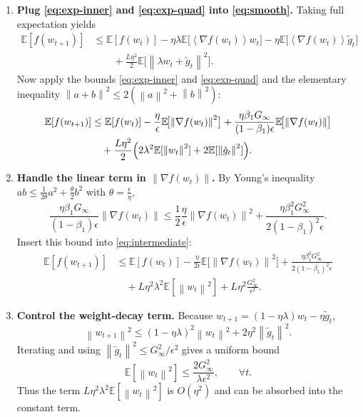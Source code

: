 \documentclass{article}
\newcommand{\E}{\mathbb{E}}
\newcommand{\norm}[1]{\left\|#1\right\|}
\newcommand{\inner}[1]{\left\langle#1\right\rangle}
\begin{document}
\begin{enumerate}
\item[Step 5.] \textbf{Plug \eqref{eq:exp-inner} and \eqref{eq:exp-quad} into \eqref{eq:smooth}.}  
Taking full expectation yields
\begin{align}
\E[f(w_{t+1})]
&\le \E[f(w_{t})]
   -\eta\lambda\E\bigl[\inner{\nabla f(w_{t})}{w_{t}}\bigr]
   -\eta\E\bigl[\inner{\nabla f(w_{t})}{\tilde g_{t}}\bigr]\nonumber\\
&\qquad +\frac{L\eta^{2}}{2}\E\!\bigl[\norm{\lambda w_{t}+\tilde g_{t}}^{2}\bigr].
\label{eq:after-exp}
\end{align}
Now apply the bounds \eqref{eq:exp-inner} and \eqref{eq:exp-quad} and the elementary inequality
$\norm{a+b}^{2}\le2(\norm{a}^{2}+\norm{b}^{2})$:
\begin{align}
\E[f(w_{t+1})]
&\le \E[f(w_{t})]
   -\frac{\eta}{\epsilon}\E\!\bigl[\norm{\nabla f(w_{t})}^{2}\bigr]
   +\frac{\eta\beta_{1}G_{\infty}}{(1-\beta_{1})\epsilon}\E\!\bigl[\norm{\nabla f(w_{t})}\bigr]\nonumber\\
&\quad +\frac{L\eta^{2}}{2}\Bigl(2\lambda^{2}\E[\norm{w_{t}}^{2}]
      +2\E[\norm{\tilde g_{t}}^{2}]\Bigr).\label{eq:intermediate}
\end{align}
\item[Step 6.] \textbf{Handle the linear term in $\norm{\nabla f(w_{t})}$.}  
By Young’s inequality $ab\le \frac{1}{2\theta}a^{2}+\frac{\theta}{2}b^{2}$ with $\theta=\frac{\epsilon}{\eta}$,
\[
\frac{\eta\beta_{1}G_{\infty}}{(1-\beta_{1})\epsilon}\norm{\nabla f(w_{t})}
   \le \frac{1}{2}\frac{\eta}{\epsilon}\norm{\nabla f(w_{t})}^{2}
      +\frac{\eta\beta_{1}^{2}G_{\infty}^{2}}{2(1-\beta_{1})^{2}\epsilon}.
\]
Insert this bound into \eqref{eq:intermediate}:
\begin{align}
\E[f(w_{t+1})]
&\le \E[f(w_{t})]
   -\frac{\eta}{2\epsilon}\E\!\bigl[\norm{\nabla f(w_{t})}^{2}\bigr]
   +\frac{\eta\beta_{1}^{2}G_{\infty}^{2}}{2(1-\beta_{1})^{2}\epsilon}\nonumber\\
&\quad +L\eta^{2}\lambda^{2}\E[\norm{w_{t}}^{2}]
   +L\eta^{2}\frac{G_{\infty}^{2}}{\epsilon^{2}}.
\label{eq:after-young}
\end{align}
\item[Step 7.] \textbf{Control the weight‑decay term.}  
Because $w_{t+1}= (1-\eta\lambda)w_{t}-\eta\tilde g_{t}$,
\[
\norm{w_{t+1}}^{2}\le (1-\eta\lambda)^{2}\norm{w_{t}}^{2}+2\eta^{2}\norm{\tilde g_{t}}^{2}.
\]
Iterating and using $\norm{\tilde g_{t}}^{2}\le G_{\infty}^{2}/\epsilon^{2}$ gives a uniform bound
\[
\E[\norm{w_{t}}^{2}]\le \frac{2G_{\infty}^{2}}{\lambda\epsilon^{2}},\qquad\forall t.
\]
Thus the term $L\eta^{2}\lambda^{2}\E[\norm{w_{t}}^{2}]$ is $O(\eta^{2})$ and can be absorbed into the constant term.


\end{enumerate}
\end{document}
